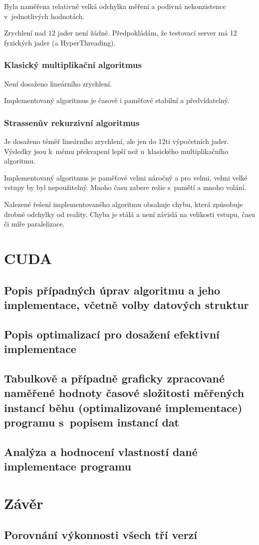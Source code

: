 \documentclass[12pt,a4paper]{article}
\begin{document}
Byla naměřena relativně velká odchylka měření a podivná nekonzistence v~jednotlivých hodnotách. 
\bigskip

Zrychlení nad 12 jader není žádné. Předpokládám, že testovací server má 12 fyzických jader (a HyperThreading).

\subsubsection{Klasický multiplikační algoritmus}

Není dosaženo lineárního zrychlení.
\bigskip

Implementovaný algoritmus je časově i paměťové stabilní a předvídatelný.


\subsubsection{Strassenův rekurzivní algoritmus}

Je dosaženo téměř lineárního zrychlení, ale jen do 12ti výpočetních jader. Výsledky jsou k~mému překvapení lepší než u~klasického multiplikačního algoritmu.
\bigskip

Implementovaný algoritmus je paměťové velmi náročný a pro velmi, velmi velké vstupy by byl nepoužitelný. Mnoho času zabere režie s~pamětí a mnoho volání.
\bigskip

Nalezené řešení implementovaného algoritmu obsahuje chybu, která způsobuje drobné odchylky od reality. Chyba je stálá a není závislá na velikosti vstupu, času či míře paralelizace.


\section{CUDA}
\subsection{Popis případných úprav algoritmu a jeho implementace, včetně volby datových struktur}
\subsection{Popis optimalizací pro dosažení efektivní implementace}
\subsection{Tabulkově a případně graficky zpracované naměřené hodnoty časové složitosti měřených instancí běhu (optimalizované implementace) programu s~popisem instancí dat}
\subsection{Analýza a hodnocení vlastností dané implementace programu}

\section{Závěr}
\subsection{Porovnání výkonnosti všech tří verzí}
\end{document}
